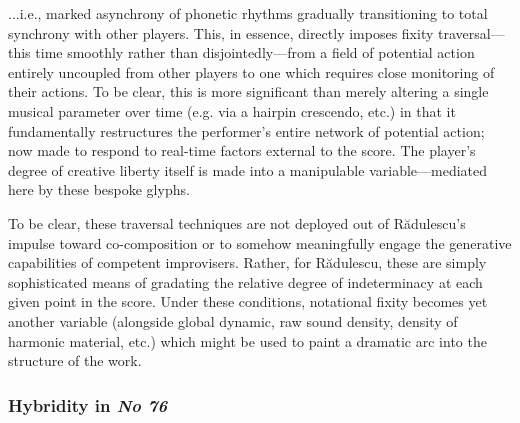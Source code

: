         \noindent...i.e., marked asynchrony of phonetic rhythms gradually transitioning to total synchrony with other players. This, in essence, directly imposes fixity traversal---this time smoothly rather than disjointedly---from a field of potential action entirely uncoupled from other players to one which requires close monitoring of their actions. To be clear, this is more significant than merely altering a single musical parameter over time (e.g. via a hairpin crescendo, etc.) in that it fundamentally restructures the performer's entire network of potential action; now made to respond to real-time factors external to the score. The player's degree of creative liberty itself is made into a manipulable variable---mediated here by these bespoke glyphs.

        To be clear, these traversal techniques are not deployed out of R\u{a}dulescu's impulse toward co-composition or to somehow meaningfully engage the generative capabilities of competent improvisers. Rather, for R\u{a}dulescu, these are simply sophisticated means of gradating the relative degree of indeterminacy at each given point in the score. Under these conditions, notational fixity becomes yet another variable (alongside global dynamic, raw sound density, density of harmonic material, etc.) which might be used to paint a dramatic arc into the structure of the work.


    \subsubsection{Hybridity in \textit{No 76}}

